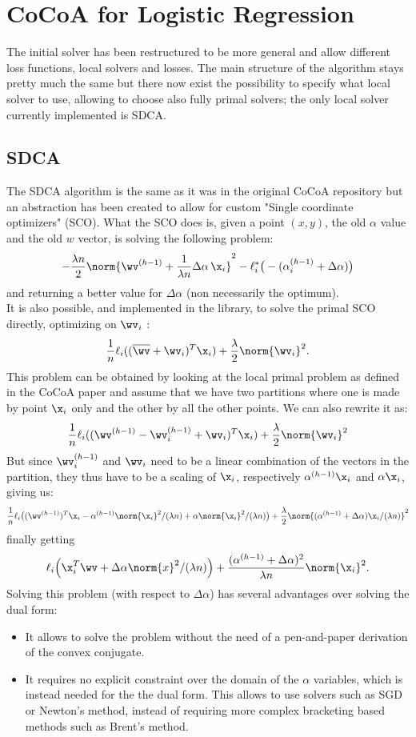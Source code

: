 \section{CoCoA for Logistic Regression}
The initial solver has been restructured to be more general and allow different loss functions, local solvers and losses. The main structure of the algorithm stays pretty much the same but there now exist the possibility to specify what local solver to use, allowing to choose also fully primal solvers; the only local solver currently implemented is SDCA.

\subsection{SDCA}
The SDCA algorithm is the same as it was in the original CoCoA repository but an abstraction has been created to allow for custom "Single coordinate optimizers" (SCO). What the SCO does is, given a point $(x,y)$, the old $\alpha$ value and the old $w$ vector, is solving the following problem:
$$ 
	- \frac{\lambda n}{2}  \norm{ \wv^{(h-1)} +\frac{1}{\lambda n} \Delta\alpha\,\x_i }^2 
	- \ell_i^*\big(-(\alpha_i^{(h-1)}+\Delta\alpha)\big)
$$
and returning a better value for $\Delta\alpha$ (non necessarily the optimum). \\
It is also possible, and implemented in the library, to solve the primal SCO directly, optimizing on $\wv_i$ :
$$
\frac1{n} \ell_i( (\overline\wv+\wv_i)^T \x_i )  + \frac{\lambda}{2}\norm{\wv_i}^2.
$$
This problem can be obtained by looking at the local primal problem as defined in the CoCoA paper and assume that we have two partitions where one is made by point $\x_i$ only and the other by all the other points. We can also rewrite it as:
$$
\frac1{n} \ell_i( (\wv^{(h-1)}-\wv^{(h-1)}_i+\wv_i)^T \x_i )  + \frac{\lambda}{2}\norm{\wv_i}^2
$$
But since $\wv_i^{(h-1)}$ and $\wv_i$ need to be a linear combination of the vectors in the partition, they thus have to be a scaling of $\x_i$, respectively $\alpha^{(h-1)}\x_i$ and $\alpha\x_i$, giving us:
$$
\frac1{n} \ell_i\big( (\wv^{(h-1)})^T\x_i - \alpha^{(h-1)}\norm{\x_i}^2/(\lambda n) + \alpha\norm{\x_i}^2/(\lambda n) \big)  + \frac{\lambda}{2}\norm{(\alpha^{(h-1)} +\Delta\alpha)\x_i/(\lambda n)}^2
$$
finally getting
$$ 
	 \ell_i\Big(\x_i^T \wv + \Delta\alpha \norm{x}^2/(\lambda n) \Big)
	+ \frac{(\alpha^{(h-1)} + \Delta\alpha)^2}{\lambda n}\norm{\x_i}^2.
$$
Solving this problem (with respect to $\Delta\alpha$) has several advantages over solving the dual form:
\begin{itemize}
\item It allows to solve the problem without the need of a pen-and-paper derivation of the convex conjugate.
\item It requires no explicit constraint over the domain of the $\alpha$ variables, which is instead needed for the the dual form. This allows to use solvers such as SGD or Newton's method, instead of requiring more complex bracketing based methods such as Brent's method.
\end{itemize}
 
